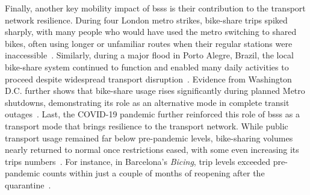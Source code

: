     Finally, another key mobility impact of \acp{bss} is their contribution to the transport network resilience. During four London metro strikes, bike-share trips spiked sharply, with many people who would have used the metro switching to shared bikes, often using longer or unfamiliar routes when their regular stations were inaccessible~\cite{Yang2022}. Similarly, during a major flood in Porto Alegre, Brazil, the local bike-share system continued to function and enabled many daily activities to proceed despite widespread transport disruption~\cite{Araujo2025}. Evidence from Washington D.C. further shows that bike-share usage rises significantly during planned Metro shutdowns, demonstrating its role as an alternative mode in complete transit outages~\cite{Cheng2022}. Last, the COVID-19 pandemic further reinforced this role of \acp{bss} as a transport mode that brings resilience to the transport network. While public transport usage remained far below pre-pandemic levels, bike-sharing volumes nearly returned to normal once restrictions eased, with some even increasing its trips numbers~\cite{Teixeira2024}. For instance, in Barcelona's \textit{Bicing}, trip levels exceeded pre-pandemic counts within just a couple of months of reopening after the quarantine~\cite{Grau-Escolano2024}.